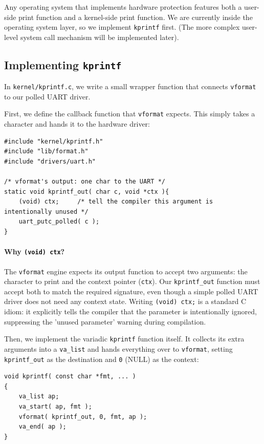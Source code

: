 Any operating system that implements hardware protection features both a user-side print function and a kernel-side print function. We are currently inside the operating system layer, so we implement \texttt{kprintf} first. (The more complex user-level system call mechanism will be implemented later).

\subsection{Implementing \texttt{kprintf}}
In \texttt{kernel/kprintf.c}, we write a small wrapper function that connects \texttt{vformat} to our polled UART driver.

First, we define the callback function that \texttt{vformat} expects. This simply takes a character and hands it to the hardware driver:
\begin{lstlisting}
#include "kernel/kprintf.h"
#include "lib/format.h"
#include "drivers/uart.h"

/* vformat's output: one char to the UART */
static void kprintf_out( char c, void *ctx ){
    (void) ctx;     /* tell the compiler this argument is intentionally unused */
    uart_putc_polled( c );
}
\end{lstlisting}

\paragraph{Why \texttt{(void) ctx}?} 
The \texttt{vformat} engine expects its output function to accept two arguments: the character to print and the context pointer (\texttt{ctx}). Our \texttt{kprintf\_out} function must accept both to match the required signature, even though a simple polled UART driver does not need any context state. Writing \texttt{(void) ctx;} is a standard C idiom: it explicitly tells the compiler that the parameter is intentionally ignored, suppressing the 'unused parameter' warning during compilation.

Then, we implement the variadic \texttt{kprintf} function itself. It collects its extra arguments into a \texttt{va\_list} and hands everything over to \texttt{vformat}, setting \texttt{kprintf\_out} as the destination and \texttt{0} (NULL) as the context:
\begin{lstlisting}
void kprintf( const char *fmt, ... )
{
    va_list ap;
    va_start( ap, fmt );
    vformat( kprintf_out, 0, fmt, ap );
    va_end( ap );
}
\end{lstlisting}

